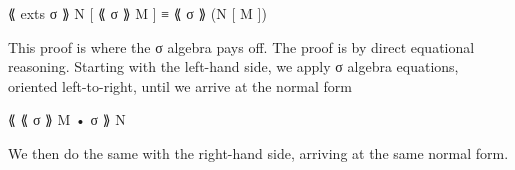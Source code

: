 \begin{myDisplay}
⟪ exts σ ⟫ N [ ⟪ σ ⟫ M ] ≡ ⟪ σ ⟫ (N [ M ])
\end{myDisplay}

This proof is where the σ algebra pays off. The proof is by direct
equational reasoning. Starting with the left-hand side, we apply σ
algebra equations, oriented left-to-right, until we arrive at the normal
form

\begin{myDisplay}
⟪ ⟪ σ ⟫ M • σ ⟫ N
\end{myDisplay}

We then do the same with the right-hand side, arriving at the same
normal form.

\begin{fence}
\begin{code}%
\>[0]\AgdaSpace{}%
\AgdaSymbol{:}\AgdaSpace{}%
\AgdaSpace{}%
\AgdaSymbol{\}\{}\AgdaSpace{}%
\AgdaSymbol{:}\AgdaSpace{}%
\AgdaSpace{}%
\AgdaOperator{\AgdaInductiveConstructor{,}}\AgdaSpace{}%
\AgdaSpace{}%
\AgdaSpace{}%
\AgdaSymbol{\}\{}\AgdaSpace{}%
\AgdaSymbol{:}\AgdaSpace{}%
\AgdaSpace{}%
\AgdaSpace{}%
\AgdaSymbol{\}\{}\AgdaSpace{}%
\AgdaSymbol{:}\AgdaSpace{}%
\AgdaSpace{}%
\AgdaSpace{}%
\AgdaSpace{}%
\AgdaSymbol{\}}\<%
\\
\>[0][@{}l@{\AgdaIndent{0}}]%
\>[4]\AgdaSpace{}%
\AgdaSpace{}%
\AgdaSpace{}%
\AgdaSpace{}%
\AgdaSpace{}%
\AgdaSpace{}%
\AgdaOperator{\AgdaFunction{[}}\AgdaSpace{}%
\AgdaSpace{}%
\AgdaSpace{}%
\AgdaSpace{}%
\AgdaSpace{}%
\AgdaOperator{\AgdaFunction{]}}\AgdaSpace{}%
\AgdaSpace{}%
\AgdaSpace{}%
\AgdaSpace{}%
\AgdaSpace{}%
\AgdaSymbol{(}\AgdaSpace{}%
\AgdaOperator{\AgdaFunction{[}}\AgdaSpace{}%
\AgdaSpace{}%
\AgdaOperator{\AgdaFunction{]}}\AgdaSymbol{)}\<%
\\
\>[0]\AgdaSpace{}%
\AgdaSymbol{\{}\AgdaSymbol{\}\{}\AgdaSymbol{\}\{}\AgdaSymbol{\}\{}\AgdaSymbol{\}\{}\AgdaSymbol{\}}\AgdaSpace{}%

\end{code}
\end{fence}
